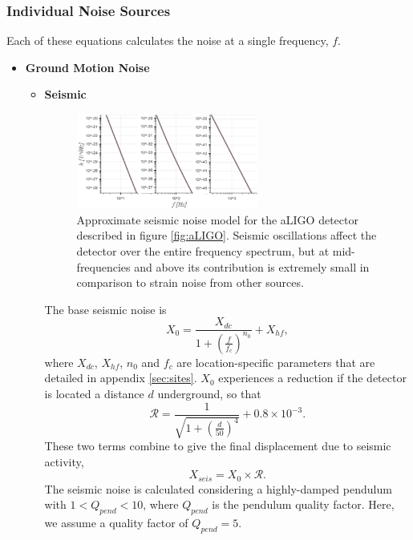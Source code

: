 \documentclass{article}
\begin{document}
\subsubsection{Individual Noise Sources}
Each of these equations calculates the noise at a single frequency, $f$.
\begin{itemize}
	\item \textbf{Ground Motion Noise} \\
    \begin{itemize}
    \item \textbf{Seismic} \\
       \begin{figure}[h!]
    \centering
    \includegraphics[width=0.6\textwidth]{SPQ_aLIGO_seismic.pdf}
    \caption{Approximate seismic noise model for the aLIGO detector
      described in figure \ref{fig:aLIGO}. Seismic oscillations affect
      the detector over the entire frequency spectrum, but at
      mid-frequencies and above its contribution is extremely small in
      comparison to strain noise from other sources.}
    \label{fig:seismic}
    \end{figure}
   The base seismic noise is
    \begin{equation}
    \label{eqn::baseseismic}
    X_0 = \frac{X_{dc}}{1 + \left(\frac{f}{f_c}\right)^{n_0}} + X_{hf},
    \end{equation}
    where $X_{dc}$, $X_{hf}$, $n_0$ and $f_c$ are location-specific
    parameters that are detailed in appendix \ref{sec:sites}. $X_0$
    experiences a reduction if the detector is located a distance $d$
    underground, so that
    \[
    \mathcal{R} = \frac{1}{\sqrt{1 + \left(\frac{d}{50}\right)^4}} + 0.8\times10^{-3} .
    \]
    These two terms combine to give the final displacement due to seismic activity,
    \begin{equation}
        X_{seis} = X_0 \times \mathcal{R}.
    \label{eq:Xseis}
    \end{equation}
    The seismic noise is calculated considering a highly-damped
    pendulum with $1 < Q_{pend} < 10$, where $Q_{pend}$ is the
    pendulum quality factor. Here, we assume a quality factor of
    $Q_{pend} = 5$. 
    

\end{itemize}
\end{itemize}
\end{document}
